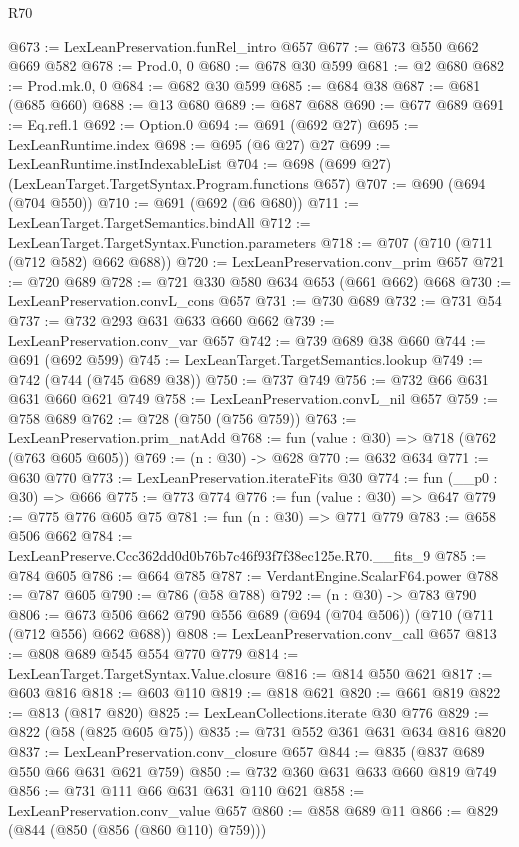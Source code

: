 \begin{lexlean}{R70}
\begin{coremodule}
@673 := LexLeanPreservation.funRel_intro @657
@677 := @673 @550 @662 @669 @582
@678 := Prod.{0, 0}
@680 := @678 @30 @599
@681 := @2 @680
@682 := Prod.mk.{0, 0}
@684 := @682 @30 @599
@685 := @684 @38
@687 := @681 (@685 @660)
@688 := @13 @680
@689 := @687 @688
@690 := @677 @689
@691 := Eq.refl.{1}
@692 := Option.{0}
@694 := @691 (@692 @27)
@695 := LexLeanRuntime.index
@698 := @695 (@6 @27) @27
@699 := LexLeanRuntime.instIndexableList
@704 := @698 (@699 @27) (LexLeanTarget.TargetSyntax.Program.functions @657)
@707 := @690 (@694 (@704 @550))
@710 := @691 (@692 (@6 @680))
@711 := LexLeanTarget.TargetSemantics.bindAll
@712 := LexLeanTarget.TargetSyntax.Function.parameters
@718 := @707 (@710 (@711 (@712 @582) @662 @688))
@720 := LexLeanPreservation.conv_prim @657
@721 := @720 @689
@728 := @721 @330 @580 @634 @653 (@661 @662) @668
@730 := LexLeanPreservation.convL_cons @657
@731 := @730 @689
@732 := @731 @54
@737 := @732 @293 @631 @633 @660 @662
@739 := LexLeanPreservation.conv_var @657
@742 := @739 @689 @38 @660
@744 := @691 (@692 @599)
@745 := LexLeanTarget.TargetSemantics.lookup
@749 := @742 (@744 (@745 @689 @38))
@750 := @737 @749
@756 := @732 @66 @631 @631 @660 @621 @749
@758 := LexLeanPreservation.convL_nil @657
@759 := @758 @689
@762 := @728 (@750 (@756 @759))
@763 := LexLeanPreservation.prim_natAdd
@768 := fun (value : @30) => @718 (@762 (@763 @605 @605))
@769 := (n : @30) -> @628
@770 := @632 @634
@771 := @630 @770
@773 := LexLeanPreservation.iterateFits @30
@774 := fun (__p0 : @30) => @666
@775 := @773 @774
@776 := fun (value : @30) => @647
@779 := @775 @776 @605 @75
@781 := fun (n : @30) => @771 @779
@783 := @658 @506 @662
@784 := LexLeanPreserve.Ccc362dd0d0b76b7c46f93f7f38ec125e.R70.__fits_9
@785 := @784 @605
@786 := @664 @785
@787 := VerdantEngine.ScalarF64.power
@788 := @787 @605
@790 := @786 (@58 @788)
@792 := (n : @30) -> @783 @790
@806 := @673 @506 @662 @790 @556 @689 (@694 (@704 @506)) (@710 (@711 (@712 @556) @662 @688))
@808 := LexLeanPreservation.conv_call @657
@813 := @808 @689 @545 @554 @770 @779
@814 := LexLeanTarget.TargetSyntax.Value.closure
@816 := @814 @550 @621
@817 := @603 @816
@818 := @603 @110
@819 := @818 @621
@820 := @661 @819
@822 := @813 (@817 @820)
@825 := LexLeanCollections.iterate @30 @776
@829 := @822 (@58 (@825 @605 @75))
@835 := @731 @552 @361 @631 @634 @816 @820
@837 := LexLeanPreservation.conv_closure @657
@844 := @835 (@837 @689 @550 @66 @631 @621 @759)
@850 := @732 @360 @631 @633 @660 @819 @749
@856 := @731 @111 @66 @631 @631 @110 @621
@858 := LexLeanPreservation.conv_value @657
@860 := @858 @689 @11
@866 := @829 (@844 (@850 (@856 (@860 @110) @759)))

\end{coremodule}
\end{lexlean}
